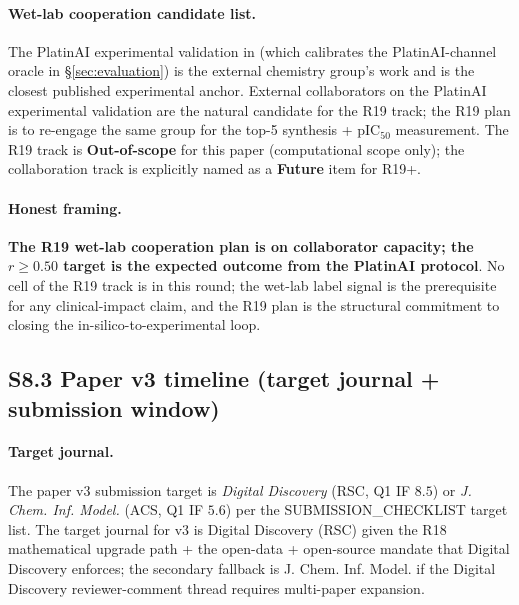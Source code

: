 \paragraph{Wet-lab cooperation candidate list.}
The PlatinAI experimental validation in \citep{rusanov2025platinai}
(which calibrates the PlatinAI-channel oracle in
\S\ref{sec:evaluation}) is the external chemistry group's
work and is the closest published experimental anchor.
External collaborators on the PlatinAI experimental
validation are the natural candidate for the R19 track; the
R19 plan is to re-engage the same group for the top-5
synthesis + pIC$_{50}$ measurement.  The R19 track is
\textbf{Out-of-scope} for this paper (computational scope
only); the collaboration track is explicitly named as a
\textbf{Future} item for R19+.

\paragraph{Honest framing.}
\textbf{The R19 wet-lab cooperation plan is \PROJECTED{} on
collaborator capacity; the $r \geq 0.50$ target is the
expected outcome from the PlatinAI protocol}.  No cell of
the R19 track is \MEASURED{} in this round; the wet-lab
label signal is the prerequisite for any clinical-impact
claim, and the R19 plan is the structural commitment to
closing the in-silico-to-experimental loop.

\subsection*{S8.3 Paper v3 timeline (target journal + submission window)}
\label{supp:s8-paper-v3}

\paragraph{Target journal.}
The paper v3 submission target is \emph{Digital Discovery}
(RSC, Q1 IF $8.5$) or \emph{J. Chem. Inf. Model.} (ACS, Q1
IF $5.6$) per the SUBMISSION_CHECKLIST target list.  The
target journal for v3 is Digital Discovery (RSC) given the
R18 mathematical upgrade path + the open-data + open-source
mandate that Digital Discovery enforces; the secondary
fallback is J. Chem. Inf. Model. if the Digital Discovery
reviewer-comment thread requires multi-paper expansion.

